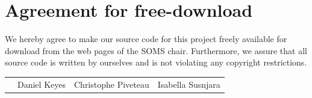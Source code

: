 \documentclass[11pt]{article}
\begin{document}

\newpage


\newpage
\section*{Agreement for free-download}
\bigskip


\bigskip


\large We hereby agree to make our source code for this project freely available for download from the web pages of the SOMS chair. Furthermore, we assure that all source code is written by ourselves and is not violating any copyright restrictions.

\begin{center}

\bigskip


\bigskip


\begin{tabular}{@{}p{1.3cm}@{}p{5cm}@{}@{}p{5cm}@{}@{}p{5cm}@{}}
\begin{minipage}{3cm}

\end{minipage}
&
\begin{minipage}{6cm}
\vspace{2mm} \large Daniel Keyes

 \vspace{\baselineskip}

\end{minipage}
&
\begin{minipage}{6cm}

\large Christophe Piveteau

\end{minipage}
&
\begin{minipage}{6cm}

\large Isabella Susnjara

\end{minipage}
\end{tabular}


\end{center}
\newpage






\tableofcontents

\newpage

\end{document}
